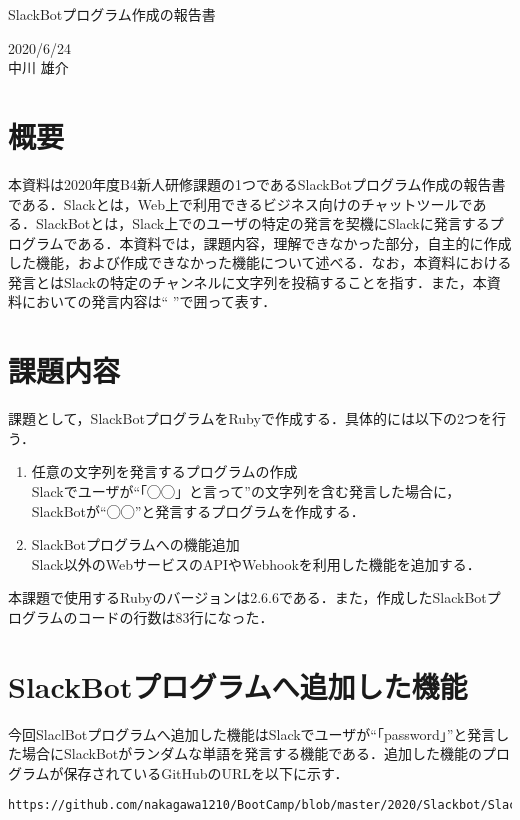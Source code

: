 \documentclass[12pt]{jsarticle}
\begin{document}
\begin{center}
{\LARGE SlackBotプログラム作成の報告書}
\end{center}

\begin{flushright}
  2020/6/24\\
  中川 雄介
\end{flushright}
\section{概要}\label{sec1}
\label{sec:introduction}
本資料は2020年度B4新人研修課題の1つであるSlackBotプログラム作成の報告書である．Slackとは，Web上で利用できるビジネス向けのチャットツールである．SlackBotとは，Slack上でのユーザの特定の発言を契機にSlackに発言するプログラムである．本資料では，課題内容，理解できなかった部分，自主的に作成した機能，および作成できなかった機能について述べる．なお，本資料における発言とはSlackの特定のチャンネルに文字列を投稿することを指す．また，本資料においての発言内容は`` ''で囲って表す．

\section{課題内容}\label{sec2}
課題として，SlackBotプログラムをRubyで作成する．具体的には以下の2つを行う．
\begin{enumerate}
\item 任意の文字列を発言するプログラムの作成\\
  Slackでユーザが``「◯◯」と言って''の文字列を含む発言した場合に，SlackBotが``◯◯''と発言するプログラムを作成する．\label{item1}
\item SlackBotプログラムへの機能追加\\
  Slack以外のWebサービスのAPIやWebhookを利用した機能を追加する．\label{item2}
  
\end{enumerate}
本課題で使用するRubyのバージョンは2.6.6である．また，作成したSlackBotプログラムのコードの行数は83行になった．
\section{SlackBotプログラムへ追加した機能}\label{func}
今回SlaclBotプログラムへ追加した機能はSlackでユーザが``「password」''と発言した場合にSlackBotがランダムな単語を発言する機能である．追加した機能のプログラムが保存されているGitHubのURLを以下に示す．
\begin{verbatim}
https://github.com/nakagawa1210/BootCamp/blob/master/2020/Slackbot/SlackBot.rb
\end{verbatim}
\end{document}
